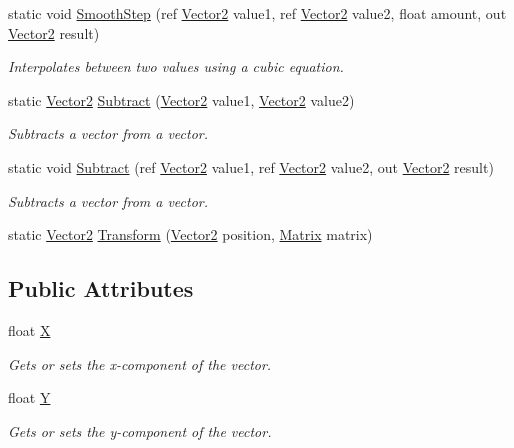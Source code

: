 \begin{DoxyCompactItemize}
static void \hyperlink{structMicrosoft_1_1Xna_1_1Framework_1_1Vector2_a970a57ffc38d67cc614b5fc3ec496825}{Smooth\+Step} (ref \hyperlink{structMicrosoft_1_1Xna_1_1Framework_1_1Vector2}{Vector2} value1, ref \hyperlink{structMicrosoft_1_1Xna_1_1Framework_1_1Vector2}{Vector2} value2, float amount, out \hyperlink{structMicrosoft_1_1Xna_1_1Framework_1_1Vector2}{Vector2} result)
\begin{DoxyCompactList}\small\item\em Interpolates between two values using a cubic equation.\end{DoxyCompactList}\item 
static \hyperlink{structMicrosoft_1_1Xna_1_1Framework_1_1Vector2}{Vector2} \hyperlink{structMicrosoft_1_1Xna_1_1Framework_1_1Vector2_ad44a15393c4dc1597e79ff1e54708bc9}{Subtract} (\hyperlink{structMicrosoft_1_1Xna_1_1Framework_1_1Vector2}{Vector2} value1, \hyperlink{structMicrosoft_1_1Xna_1_1Framework_1_1Vector2}{Vector2} value2)
\begin{DoxyCompactList}\small\item\em Subtracts a vector from a vector.\end{DoxyCompactList}\item 
static void \hyperlink{structMicrosoft_1_1Xna_1_1Framework_1_1Vector2_a1143e440374787baa601ade7e5428326}{Subtract} (ref \hyperlink{structMicrosoft_1_1Xna_1_1Framework_1_1Vector2}{Vector2} value1, ref \hyperlink{structMicrosoft_1_1Xna_1_1Framework_1_1Vector2}{Vector2} value2, out \hyperlink{structMicrosoft_1_1Xna_1_1Framework_1_1Vector2}{Vector2} result)
\begin{DoxyCompactList}\small\item\em Subtracts a vector from a vector.\end{DoxyCompactList}\item 
static \hyperlink{structMicrosoft_1_1Xna_1_1Framework_1_1Vector2}{Vector2} \hyperlink{structMicrosoft_1_1Xna_1_1Framework_1_1Vector2_acffe477f24a6632f3bd825fb6750ae33}{Transform} (\hyperlink{structMicrosoft_1_1Xna_1_1Framework_1_1Vector2}{Vector2} position, \hyperlink{structMicrosoft_1_1Xna_1_1Framework_1_1Matrix}{Matrix} matrix)
\end{DoxyCompactItemize}
\subsection*{Public Attributes}
\begin{DoxyCompactItemize}
\item 
float \hyperlink{structMicrosoft_1_1Xna_1_1Framework_1_1Vector2_ab3c4b737dfc5c78a6aba50dda616f7c3}{X}
\begin{DoxyCompactList}\small\item\em Gets or sets the x-\/component of the vector.\end{DoxyCompactList}\item 
float \hyperlink{structMicrosoft_1_1Xna_1_1Framework_1_1Vector2_ac915220fb659eb2c5958a1ccd81b80d4}{Y}
\begin{DoxyCompactList}\small\item\em Gets or sets the y-\/component of the vector.\end{DoxyCompactList}\end{DoxyCompactItemize}
